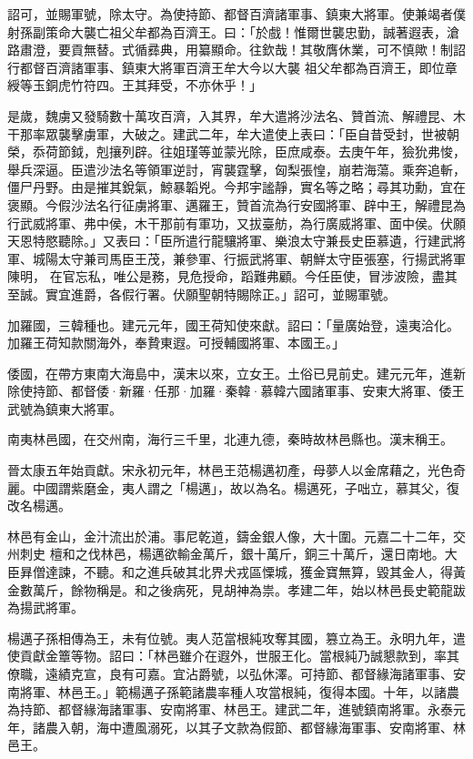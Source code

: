 \begin{pinyinscope}
 詔可，並賜軍號，除太守。為使持節、都督百濟諸軍事、鎮東大將軍。使兼竭者僕射孫副策命大襲亡祖父牟都為百濟王。曰：「於戲！惟爾世襲忠勤，誠著遐表，滄路肅澄，要貢無替。式循彞典，用纂顯命。往欽哉！其敬膺休業，可不慎歟！制詔行都督百濟諸軍事、鎮東大將軍百濟王牟大今以大襲
 祖父牟都為百濟王，即位章綬等玉銅虎竹符四。王其拜受，不亦休乎！」



 是歲，魏虜又發騎數十萬攻百濟，入其界，牟大遣將沙法名、贊首流、解禮昆、木干那率眾襲擊虜軍，大破之。建武二年，牟大遣使上表曰：「臣自昔受封，世被朝榮，忝荷節鉞，剋攘列辟。往姐瑾等並蒙光除，臣庶咸泰。去庚午年，獫狁弗悛，舉兵深逼。臣遣沙法名等領軍逆討，宵襲霆擊，匈梨張惶，崩若海蕩。乘奔追斬，僵尸丹野。由是摧其銳氣，鯨暴韜兇。今邦宇謐靜，實名等之略；尋其功勳，宜在褒顯。今假沙法名行征虜將軍、邁羅王，贊首流為行安國將軍、辟中王，解禮昆為行武威將軍、弗中侯，木干那前有軍功，又拔臺舫，為行廣威將軍、面中侯。伏願天恩特愍聽除。」又表曰：「臣所遣行龍驤將軍、樂浪太守兼長史臣慕遺，行建武將軍、城陽太守兼司馬臣王茂，兼參軍、行振武將軍、朝鮮太守臣張塞，行揚武將軍陳明，
 在官忘私，唯公是務，見危授命，蹈難弗顧。今任臣使，冒涉波險，盡其至誠。實宜進爵，各假行署。伏願聖朝特賜除正。」詔可，並賜軍號。



 加羅國，三韓種也。建元元年，國王荷知使來獻。詔曰：「量廣始登，遠夷洽化。加羅王荷知款關海外，奉贄東遐。可授輔國將軍、本國王。」



 倭國，在帶方東南大海島中，漢末以來，立女王。土俗已見前史。建元元年，進新除使持節、都督倭·新羅·任那·加羅·秦韓·慕韓六國諸軍事、安東大將軍、倭王武號為鎮東大將軍。



 南夷林邑國，在交州南，海行三千里，北連九德，秦時故林邑縣也。漢末稱王。



 晉太康五年始貢獻。宋永初元年，林邑王范楊邁初產，母夢人以金席藉之，光色奇麗。中國謂紫磨金，夷人謂之「楊邁」，故以為名。楊邁死，子咄立，慕其父，復改名楊邁。



 林邑有金山，金汁流出於浦。事尼乾道，鑄金銀人像，大十圍。元嘉二十二年，交州刺史
 檀和之伐林邑，楊邁欲輸金萬斤，銀十萬斤，銅三十萬斤，還日南地。大臣昪僧達諫，不聽。和之進兵破其北界犬戎區慄城，獲金寶無算，毀其金人，得黃金數萬斤，餘物稱是。和之後病死，見胡神為祟。孝建二年，始以林邑長史範龍跋為揚武將軍。



 楊邁子孫相傳為王，未有位號。夷人范當根純攻奪其國，篡立為王。永明九年，遣使貢獻金簟等物。詔曰：「林邑雖介在遐外，世服王化。當根純乃誠懇款到，率其僚職，遠績克宣，良有可嘉。宜沾爵號，以弘休澤。可持節、都督緣海諸軍事、安南將軍、林邑王。」範楊邁子孫範諸農率種人攻當根純，復得本國。十年，以諸農為持節、都督緣海諸軍事、安南將軍、林邑王。建武二年，進號鎮南將軍。永泰元年，諸農入朝，海中遭風溺死，以其子文款為假節、都督緣海軍事、安南將軍、林邑王。




\end{pinyinscope}

